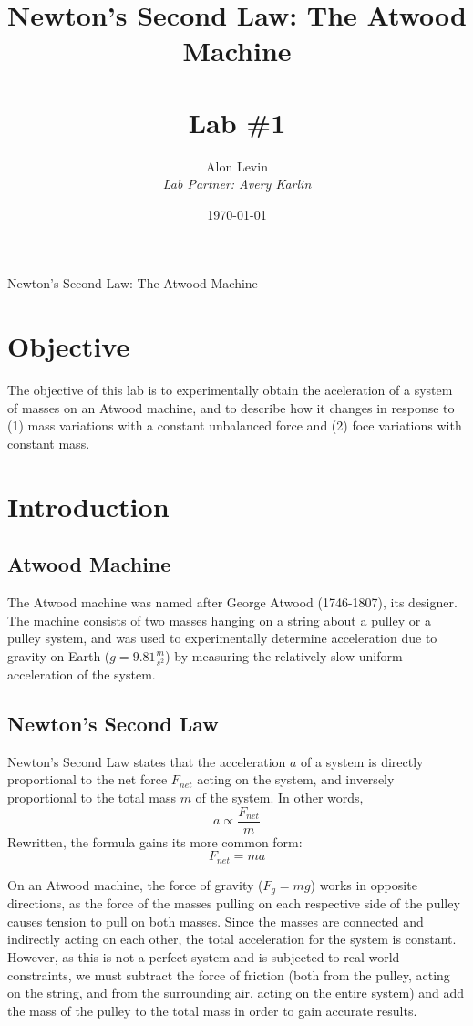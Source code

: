\documentclass[11pt, titlepage]{article}
\title{\Huge{Newton's Second Law: The Atwood Machine} \\ \ \\ \huge Lab \#1}
\author{\Large{Alon Levin} \\ \emph{Lab Partner: Avery Karlin}}
\date{\today}
\begin{document}
\maketitle

\begin{center}
\LARGE Newton's Second Law: The Atwood Machine
\end{center}

\section*{Objective}
The objective of this lab is to experimentally obtain the aceleration of a system of masses on an Atwood machine, and to describe how it changes in response to (1) mass variations with a constant unbalanced force and (2) foce variations with constant mass.

\section*{Introduction}
\subsection*{Atwood Machine}
The Atwood machine was named after George Atwood (1746-1807), its designer. The machine consists of two masses hanging on a string about a pulley or a pulley system, and was used to experimentally determine acceleration due to gravity on Earth ($g = 9.81 \frac{m}{s^2}$) by measuring the relatively slow uniform acceleration of the system.

\subsection*{Newton's Second Law}
Newton's Second Law states that the acceleration $a$ of a system is directly proportional to the net force \textbf{$F_{net}$} acting on the system, and inversely proportional to the total mass $m$ of the system. In other words, $$ a \propto \frac{F_{net}}{m}$$
Rewritten, the formula gains its more common form: $$F_{net} = ma$$

On an Atwood machine, the force of gravity ($F_g = mg$) works in opposite directions, as the force of the masses pulling on each respective side of the pulley causes tension to pull on both masses. Since the masses are connected and indirectly acting on each other, the total acceleration for the system is constant. However, as this is not a perfect system and is subjected to real world constraints, we must subtract the force of friction (both from the pulley, acting on the string, and from the surrounding air, acting on the entire system) and add the mass of the pulley to the total mass in order to gain accurate results.
\end{document}

